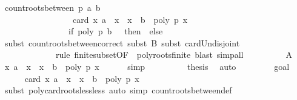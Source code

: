 \begin{isabellebody}
\ {\isachardoublequoteopen}count{\isacharunderscore}roots{\isacharunderscore}between\ p\ a\ b\ {\isacharequal}\isanewline
\ \ \ \ \ \ \ \ \ \ \ \ \ \ \ \ \ card\ {\isacharbraceleft}x{\isachardot}\ a\ {\isacharless}\ x\ {\isasymand}\ x\ {\isacharless}\ b\ {\isasymand}\ poly\ p\ x\ {\isacharequal}\ {}{\isacharbraceright}\ {\isacharplus}\isanewline
\ \ \ \ \ \ \ \ \ \ \ \ \ \ \ \ {\isacharparenleft}if\ poly\ p\ b\ {\isacharequal}\ {}\ then\ {}\ else\ {}{\isacharparenright}{\isachardoublequoteclose}\isanewline
\ \ \ \ \ \ \ \ \ \isamarkupfalse%
\ {\isacharparenleft}subst\ count{\isacharunderscore}roots{\isacharunderscore}between{\isacharunderscore}correct{\isacharcomma}\ subst\ B{\isacharcomma}\ subst\ card{\isacharunderscore}Un{\isacharunderscore}disjoint{\isacharcomma}\ \isanewline
\ \ \ \ \ \ \ \ \ \ \ \ \ rule\ finite{\isacharunderscore}subset{\isacharbrackleft}OF\ {\isacharunderscore}\ poly{\isacharunderscore}roots{\isacharunderscore}finite{\isacharbrackright}{\isacharcomma}\ blast{\isacharcomma}\ simp{\isacharunderscore}all{\isacharparenright}\isanewline
\ \ \ \ \ \ \isamarkupfalse%
\ \isamarkupfalse%
\ A\ \isamarkupfalse%
\ {\isachardoublequoteopen}{\isacharbraceleft}x{\isachardot}\ a\ {\isacharless}\ x\ {\isasymand}\ x\ {\isacharless}\ b\ {\isasymand}\ poly\ p\ x\ {\isacharequal}\ {}{\isacharbraceright}\ {\isacharequal}\ {\isacharbraceleft}{\isacharbraceright}{\isachardoublequoteclose}\ \isamarkupfalse%
\ simp\isanewline
\ \ \ \ \ \ \isamarkupfalse%
\ \isamarkupfalse%
\ {\isacharquery}thesis\ \isamarkupfalse%
\ auto\isanewline
\ \ \ \ \isamarkupfalse%
\isanewline
{}\isamarkupfalse%
\isanewline
\ \ \isamarkupfalse%
\ goal{}\isanewline
\ \ \ \ \isamarkupfalse%
\ {\isachardoublequoteopen}card\ {\isacharbraceleft}x{\isachardot}\ a\ {\isacharless}\ x\ {\isasymand}\ x\ {\isacharless}\ b\ {\isasymand}\ poly\ p\ x\ {\isacharequal}\ {}{\isacharbraceright}\ {\isacharequal}\ {}{\isachardoublequoteclose}\isanewline
\ \ \ \ \ \ \ \ \isamarkupfalse%
\ {\isacharparenleft}subst\ poly{\isacharunderscore}card{\isacharunderscore}roots{\isacharunderscore}less{\isacharunderscore}less{\isacharcomma}\ auto\ simp{\isacharcolon}\ count{\isacharunderscore}roots{\isacharunderscore}between{\isacharunderscore}def{\isacharparenright}\isanewline
\ \ \ \ \isamarkupfalse%

\end{isabellebody}
